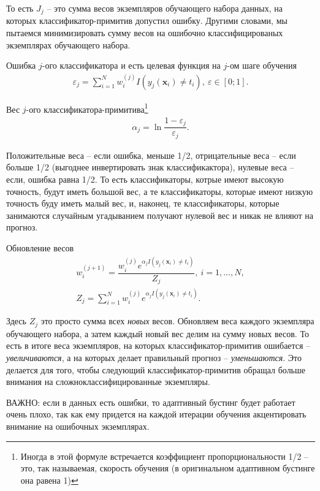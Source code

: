 \documentclass[%
	11pt,
	a4paper,
	utf8,
		]{article}
\begin{document}
То есть $ J_j $ -- это сумма весов экземпляров обучающего набора данных, на которых классификатор-примитив допустил ошибку. Другими словами, мы пытаемся минимизировать сумму весов на ошибочно классифицированых экземплярах обучающего набора.

Ошибка $ j $-ого классификатора и есть целевая функция на $ j $-ом шаге обучения
\begin{align*}
	\varepsilon_j = \sum_{i=1}^{N} w_i^{(j)} I(y_j(\mathbf{x}_i) \neq t_i),\ \varepsilon \in [0; 1].
\end{align*}

Вес $ j $-ого классификатора-примитива\footnote{Иногда в этой формуле встречается коэффициент пропорциональности 1/2 -- это, так называемая, скорость обучения (в оригинальном адаптивном бустинге она равена 1)}
\begin{align*}
	\alpha_j = \ln \dfrac{1 - \varepsilon_j}{\varepsilon_j}.
\end{align*}

Положительные веса -- если ошибка, меньше 1/2, отрицательные веса -- если больше 1/2 (выгоднее инвертировать знак классификактора), нулевые веса -- если, ошибка равна 1/2. То есть классификаторы, котрые имеют высокую точность, будут иметь большой вес, а те классификаторы, которые имеют низкую точность буду иметь малый вес, и, наконец, те классификаторы, которые занимаются случайным угадыванием получают нулевой вес и никак не влияют на прогноз.

Обновление весов
\begin{align*}
	w_i^{(j+1)} = \dfrac{w_i^{(j)} e^{\alpha_j I(y_j(\mathbf{x}_i) \neq t_i)}}{Z_j},\ i = 1, \ldots, N,\\
	Z_j = \sum\limits_{i=1}^{N} w_i^{(j)} e^{\alpha_j I(y_j(\mathbf{x}_i) \neq t_i)}.
\end{align*}

Здесь $ Z_j $ это просто сумма всех \emph{новых} весов. Обновляем веса каждого экземпляра обучающего набора, а затем каждый новый вес делим на сумму новых весов. То есть в итоге веса экземпляров, на которых классификатор-примитив ошибается -- \emph{увеличиваются}, а на которых делает правильный прогноз -- \emph{уменьшаются}. Это делается для того, чтобы следующий классификатор-примитив обращал больше внимания на сложноклассифицированные экземпляры.

ВАЖНО: если в данных есть ошибки, то адаптивный бустинг будет работает очень плохо, так как ему придется на каждой итерации обучения акцентировать внимание на ошибочных экземплярах.
\end{document}
